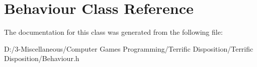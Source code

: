 \hypertarget{class_behaviour}{}\section{Behaviour Class Reference}
\label{class_behaviour}


The documentation for this class was generated from the following file\+:\begin{DoxyCompactItemize}
\item 
D\+:/3-\/\+Miscellaneous/\+Computer Games Programming/\+Terrific Disposition/\+Terrific Disposition/Behaviour.\+h\end{DoxyCompactItemize}
